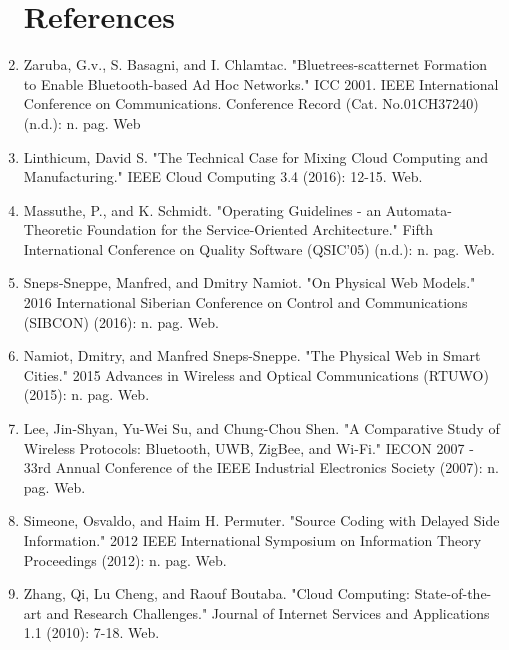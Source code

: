 \documentclass[oneside,a4paper,12pt]{report}
\begin{document}
\begin{appendices}
\begin{enumerate}
\section{References}
\item Zaruba, G.v., S. Basagni, and I. Chlamtac. "Bluetrees-scatternet Formation to Enable Bluetooth-based Ad Hoc Networks." ICC 2001. IEEE International Conference on Communications. Conference Record (Cat. No.01CH37240) (n.d.): n. pag. Web\\
\item Linthicum, David S. "The Technical Case for Mixing Cloud Computing and Manufacturing." IEEE Cloud Computing 3.4 (2016): 12-15. Web.\\
\item Massuthe, P., and K. Schmidt. "Operating Guidelines - an Automata-Theoretic Foundation for the Service-Oriented Architecture." Fifth International Conference on Quality Software (QSIC'05) (n.d.): n. pag. Web.\\
\item Sneps-Sneppe, Manfred, and Dmitry Namiot. "On Physical Web Models." 2016 International Siberian Conference on Control and Communications (SIBCON) (2016): n. pag. Web.\\
\item Namiot, Dmitry, and Manfred Sneps-Sneppe. "The Physical Web in Smart Cities." 2015 Advances in Wireless and Optical Communications (RTUWO) (2015): n. pag. Web.\\
\item Lee, Jin-Shyan, Yu-Wei Su, and Chung-Chou Shen. "A Comparative Study of Wireless Protocols: Bluetooth, UWB, ZigBee, and Wi-Fi." IECON 2007 - 33rd Annual Conference of the IEEE Industrial Electronics Society (2007): n. pag. Web.\\
\item Simeone, Osvaldo, and Haim H. Permuter. "Source Coding with Delayed Side Information." 2012 IEEE International Symposium on Information Theory Proceedings (2012): n. pag. Web.\\
\item Zhang, Qi, Lu Cheng, and Raouf Boutaba. "Cloud Computing: State-of-the-art and Research Challenges." Journal of Internet Services and Applications 1.1 (2010): 7-18. Web.\\


\end{enumerate}   


\end{appendices}
\end{document}
